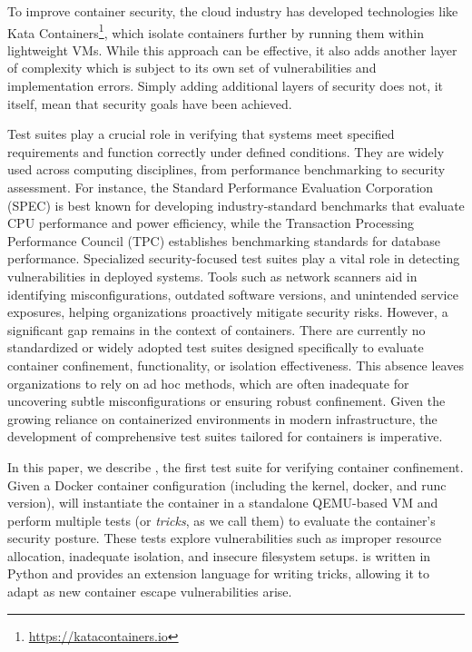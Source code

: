To improve container security, the cloud industry has developed technologies like Kata Containers\footnote{\url{https://katacontainers.io}}, which isolate containers further by running them within lightweight VMs. While this approach can be effective, it also adds another layer of complexity which is subject to its own set of vulnerabilities and implementation errors. Simply adding additional layers of security does not, it itself, mean that security goals have been achieved.

Test suites play a crucial role in verifying that systems meet specified requirements and function correctly under defined conditions. They are widely used across computing disciplines, from performance benchmarking to security assessment. For instance, the Standard Performance Evaluation Corporation (SPEC) \cite{henning2000spec} is best known for developing industry-standard benchmarks that evaluate CPU performance and power efficiency, while the Transaction Processing Performance Council (TPC) \cite{10.1007/978-3-642-18206-8_1} establishes benchmarking standards for database performance.
Specialized security-focused test suites play a vital role in detecting vulnerabilities in deployed systems. Tools such as network scanners aid in identifying misconfigurations, outdated software versions, and unintended service exposures, helping organizations proactively mitigate security risks. However, a significant gap remains in the context of containers. There are currently no standardized or widely adopted test suites designed specifically to evaluate container confinement, functionality, or isolation effectiveness. This absence leaves organizations to rely on ad hoc methods, which are often inadequate for uncovering subtle misconfigurations or ensuring robust confinement. Given the growing reliance on containerized environments in modern infrastructure, the development of comprehensive test suites tailored for containers is imperative.

In this paper, we describe \houdini, the first test suite for verifying container confinement. Given a Docker container configuration (including the kernel, docker, and runc version), \houdini will instantiate the container in a standalone QEMU-based VM and perform multiple tests (or \textit{tricks}, as we call them) to evaluate the container's security posture. These tests explore vulnerabilities such as improper resource allocation, inadequate isolation, and insecure filesystem setups. \houdini is written in Python and provides an extension language for writing tricks, allowing it to adapt as new container escape vulnerabilities arise.


